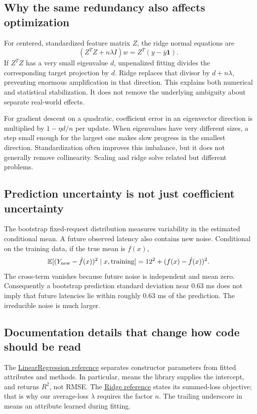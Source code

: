 \subsection*{Why the same redundancy also affects optimization}
For centered, standardized feature matrix $Z$, the ridge normal equations are
\[(Z^TZ+n\lambda I)w=Z^T(y-\bar y\mathbf 1).\]
If $Z^TZ$ has a very small eigenvalue $d$, unpenalized fitting divides the corresponding target projection by $d$.
Ridge replaces that divisor by $d+n\lambda$, preventing enormous amplification in that direction.
This explains both numerical and statistical stabilization. It does not remove the underlying ambiguity about separate real-world effects.

For gradient descent on a quadratic, coefficient error in an eigenvector direction is multiplied by
$1-\eta d/n$ per update. When eigenvalues have very different sizes, a step small enough for the largest
one makes slow progress in the smallest direction. Standardization often improves this imbalance,
but it does not generally remove collinearity. Scaling and ridge solve related but different problems.

\subsection*{Prediction uncertainty is not just coefficient uncertainty}
The bootstrap fixed-request distribution measures variability in the estimated conditional mean.
A future observed latency also contains new noise. Conditional on the training data, if the true mean is $f(x)$,
\[
\mathbb{E}[(Y_{\rm new}-\hat f(x))^2\mid x,\text{training}]
=12^2+(f(x)-\hat f(x))^2.
\]
The cross-term vanishes because future noise is independent and mean zero.
Consequently a bootstrap prediction standard deviation near 0.63 ms does not imply that future latencies lie within
roughly 0.63 ms of the prediction. The irreducible noise is much larger.

\subsection*{Documentation details that change how code should be read}
The \href{https://scikit-learn.org/1.8/modules/generated/sklearn.linear_model.LinearRegression.html}{LinearRegression reference}
separates constructor parameters from fitted attributes and methods. In particular, 
means the library supplies the intercept, and  returns $R^2$, not RMSE.
The \href{https://scikit-learn.org/1.8/modules/generated/sklearn.linear_model.Ridge.html}{Ridge reference}
states its summed-loss objective; that is why our average-loss $\lambda$ requires the factor $n$.
The trailing underscore in  means an attribute learned during fitting.

